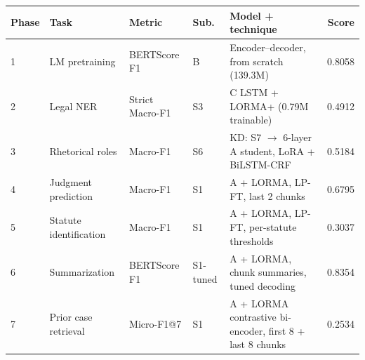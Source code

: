 \begin{tabular}{llllp{6cm}r}
\toprule
Phase & Task & Metric & Sub. & Model + technique & Score \\
\midrule
1 & LM pretraining & BERTScore F1 & B & Encoder–decoder, from scratch (139.3M) & 0.8058 \\
2 & Legal NER & Strict Macro-F1 & S3 & C LSTM + LORMA+ (0.79M trainable) & 0.4912 \\
3 & Rhetorical roles & Macro-F1 & S6 & KD: S7 $\rightarrow$ 6-layer A student, LoRA + BiLSTM-CRF & 0.5184 \\
4 & Judgment prediction & Macro-F1 & S1 & A + LORMA, LP-FT, last 2 chunks & 0.6795 \\
5 & Statute identification & Macro-F1 & S1 & A + LORMA, LP-FT, per-statute thresholds & 0.3037 \\
6 & Summarization & BERTScore F1 & S1-tuned & A + LORMA, chunk summaries, tuned decoding & 0.8354 \\
7 & Prior case retrieval & Micro-F1@7 & S1 & A + LORMA contrastive bi-encoder, first 8 + last 8 chunks & 0.2534 \\
\bottomrule
\end{tabular}
